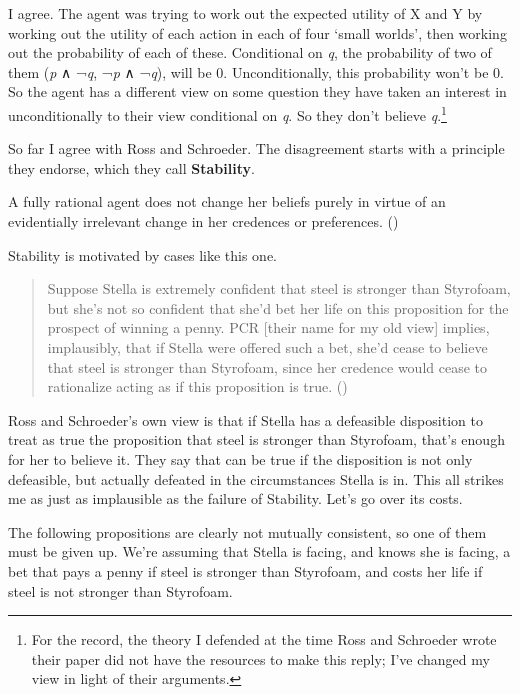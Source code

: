 \documentclass[
  10pt,
  letterpaper,
  twoside]{scrbook}
\providecommand{\tightlist}{%
  \setlength{\itemsep}{0pt}\setlength{\parskip}{0pt}}\usepackage{longtable,booktabs,array}
\begin{document}
I agree. The agent was trying to work out the expected utility of X and
Y by working out the utility of each action in each of four `small
worlds', then working out the probability of each of these. Conditional
on \emph{q}, the probability of two of them (\emph{p} ∧ ¬\emph{q},
¬\emph{p} ∧ ¬\emph{q}), will be 0. Unconditionally, this probability
won't be 0. So the agent has a different view on some question they have
taken an interest in unconditionally to their view conditional on
\emph{q}. So they don't believe \emph{q}.\footnote{For the record, the
  theory I defended at the time Ross and Schroeder wrote their paper did
  not have the resources to make this reply; I've changed my view in
  light of their arguments.}

So far I agree with Ross and Schroeder. The disagreement starts with a
principle they endorse, which they call \textbf{Stability}.

\begin{description}
\tightlist
\item[Stability]
A fully rational agent does not change her beliefs purely in virtue of
an evidentially irrelevant change in her credences or preferences.
()
\end{description}

Stability is motivated by cases like this one.

\begin{quote}
Suppose Stella is extremely confident that steel is stronger than
Styrofoam, but she's not so confident that she'd bet her life on this
proposition for the prospect of winning a penny. PCR {[}their name for
my old view{]} implies, implausibly, that if Stella were offered such a
bet, she'd cease to believe that steel is stronger than Styrofoam, since
her credence would cease to rationalize acting as if this proposition is
true. ()
\end{quote}

Ross and Schroeder's own view is that if Stella has a defeasible
disposition to treat as true the proposition that steel is stronger than
Styrofoam, that's enough for her to believe it. They say that can be
true if the disposition is not only defeasible, but actually defeated in
the circumstances Stella is in. This all strikes me as just as
implausible as the failure of Stability. Let's go over its costs.

The following propositions are clearly not mutually consistent, so one
of them must be given up. We're assuming that Stella is facing, and
knows she is facing, a bet that pays a penny if steel is stronger than
Styrofoam, and costs her life if steel is not stronger than Styrofoam.
\end{document}
